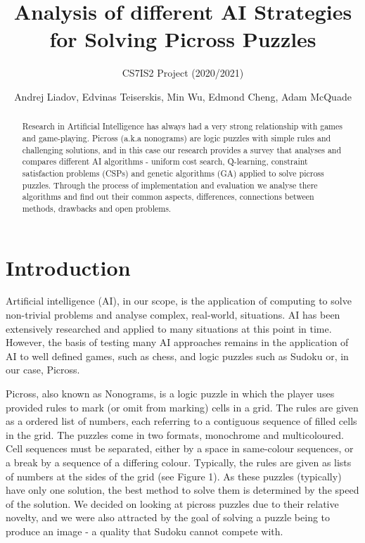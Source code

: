 \documentclass{svproc}
\begin{document}
\mainmatter
\title{Analysis of different AI Strategies for Solving Picross Puzzles}
\subtitle{CS7IS2 Project (2020/2021)}
\author{Andrej Liadov, Edvinas Teiserskis, Min Wu, Edmond Cheng, Adam McQuade}

\maketitle              %


\begin{abstract}
Research in Artificial Intelligence has always had a very strong relationship with games and game-playing. Picross (a.k.a nonograms) are logic puzzles with simple rules and challenging solutions, and in this case our research provides a survey that analyses and compares different AI algorithms - uniform cost search, Q-learning, constraint satisfaction problems (CSPs) and genetic algorithms (GA) applied to solve picross puzzles. Through the process of implementation and evaluation we analyse there algorithms and find out their common aspects, differences, connections between methods, drawbacks and open problems.
\end{abstract}


\section{Introduction}
Artificial intelligence (AI), in our scope, is the application of computing to solve non-trivial problems and analyse complex, real-world, situations.
AI has been extensively researched and applied to many situations at this point in time. However, the basis of testing many AI approaches remains in the application of AI to well defined games, such as chess, and logic puzzles such as Sudoku or, in our case, Picross.

Picross, also known as Nonograms, is a logic puzzle in which the player uses provided rules to mark (or omit from marking) cells in a grid.
The rules are given as a ordered list of numbers, each referring to a contiguous sequence of filled cells in the grid.
The puzzles come in two formats, monochrome and multicoloured.
Cell sequences must be separated, either by a space in same-colour sequences, or a break by a sequence of a differing colour.
Typically, the rules are given as lists of numbers at the sides of the grid (see Figure 1). As these puzzles (typically) have only one solution, the best method to solve them is determined by the speed of the solution.
We decided on looking at picross puzzles due to their relative novelty, and we were also attracted by the goal of solving a puzzle being to produce an image - a quality that Sudoku cannot compete with.
\end{document}
